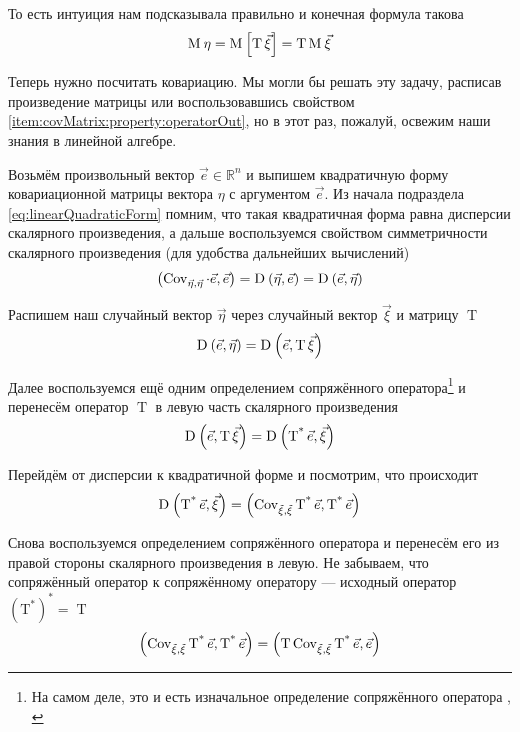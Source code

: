 То есть интуиция нам подсказывала правильно и конечная формула такова
$$\operatorname{M}_{} \eta
  = \operatorname{M}_{} \left[ \operatorname{T} \vec{\xi}  \right]
  = \operatorname{T} \operatorname{M}_{} \vec{\xi} $$

Теперь нужно посчитать ковариацию. Мы могли бы решать эту задачу,
расписав произведение матрицы или воспользовавшись свойством
\ref{item:covMatrix:property:operatorOut}, но в этот раз, пожалуй, освежим
наши знания в линейной алгебре.

Возьмём произвольный вектор $\vec{e} \in \mathbb{R}^n$
и выпишем квадратичную форму ковариационной матрицы вектора $\eta$
с аргументом $\vec{e}$. Из начала подраздела \eqref{eq:linearQuadraticForm}
помним, что такая квадратичная форма равна дисперсии скалярного произведения, а
дальше воспользуемся свойством симметричности скалярного произведения
(для удобства дальнейших вычислений)
$$\left( \operatorname{Cov}^{}_{\vec{\eta}, \vec{\eta}} \cdot \vec{e}, \vec{e} \right)
  = \operatorname{D}_{} \left( \vec{\eta}, \vec{e} \right)
  = \operatorname{D}_{} \left( \vec{e}, \vec{\eta} \right)$$

Распишем наш случайный вектор $\vec{\eta}$ через случайный вектор $\vec{\xi}$
и матрицу $\operatorname{T}$
$$\operatorname{D}_{} \left( \vec{e}, \vec{\eta} \right)
  = \operatorname{D}_{} \left( \vec{e}, \operatorname{T} \vec{\xi} \right)$$

Далее воспользуемся ещё одним определением сопряжённого оператора\footnote{На
самом деле, это и есть изначальное определение сопряжённого оператора
\cite[с.~241]{VoevodinLA}, \cite[с.~126]{IlinPoznyarLA}}
и перенесём оператор $\operatorname{T}$ в левую часть скалярного произведения
$$\operatorname{D}_{} \left( \vec{e}, \operatorname{T} \vec{\xi} \right)
  = \operatorname{D}_{} \left( \operatorname{T^*} \vec{e} , \vec{\xi} \right)$$

Перейдём от дисперсии к квадратичной форме и посмотрим, что происходит
$$\operatorname{D}_{} \left( \operatorname{T^*} \vec{e} , \vec{\xi} \right)
  = \left( \operatorname{\operatorname{Cov}^{}_{\vec{\xi}, \vec{\xi}}} \operatorname{T^*} \vec{e} ,
      \operatorname{T^*} \vec{e} \right)$$

Снова воспользуемся определением сопряжённого оператора и перенесём его
из правой стороны скалярного произведения в левую. Не забываем, что
сопряжённый оператор к сопряжённому оператору --- исходный оператор
$\left( \operatorname{T^*} \right)^* = \operatorname{T}$
$$\left( \operatorname{\operatorname{Cov}^{}_{\vec{\xi}, \vec{\xi}}} \operatorname{T^*} \vec{e},
      \operatorname{T^*} \vec{e} \right)
  = \left( \operatorname{T} \operatorname{\operatorname{Cov}^{}_{\vec{\xi}, \vec{\xi}}} \operatorname{T^*}
      \vec{e}, \vec{e} \right)$$

